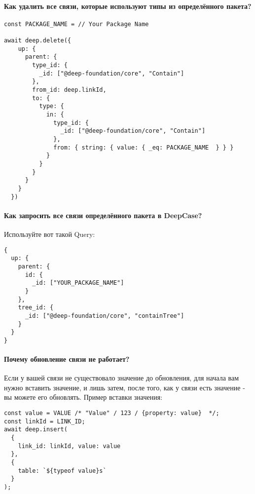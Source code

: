 \paragraph{Как удалить все связи, которые используют типы из определённого пакета?}
\begin{verbatim}
const PACKAGE_NAME = // Your Package Name

await deep.delete({
    up: {
      parent: {
        type_id: {
          _id: ["@deep-foundation/core", "Contain"]
        },
        from_id: deep.linkId,
        to: {
          type: {
            in: {
              type_id: {
                _id: ["@deep-foundation/core", "Contain"]
              },
              from: { string: { value: { _eq: PACKAGE_NAME  } } }
            }
          }
        }
      }
    }
  })
\end{verbatim}
\paragraph{Как запросить все связи определённого пакета в DeepCase?}
Используйте вот такой Query:
\begin{verbatim}
{
  up: {
    parent: {
      id: {
        _id: ["YOUR_PACKAGE_NAME"]
      }
    },
    tree_id: {
      _id: ["@deep-foundation/core", "containTree"]
    }
  }
}
\end{verbatim}
\paragraph{Почему обновление связи не работает?}
Если у вашей связи не существовало значение до обновления, для начала вам нужно вставить значение, и лишь затем, после того, как у связи есть значение - вы можете его обновлять.
Пример вставки значения:
\begin{verbatim}
const value = VALUE /* "Value" / 123 / {property: value}  */;
const linkId = LINK_ID;
await deep.insert(
  {
    link_id: linkId, value: value 
  },
  {
    table: `${typeof value}s`
  }
);
\end{verbatim}
